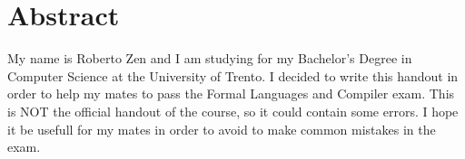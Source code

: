 \chapter*{Abstract}
My name is Roberto Zen and I am studying for my Bachelor’s Degree in Computer Science at the University of Trento.
I decided to write this handout in order to help my mates to pass the Formal Languages and Compiler exam. This is NOT the official handout of the course, so it could contain some errors.
I hope it be usefull for my mates in order to avoid to make common mistakes in the exam.
